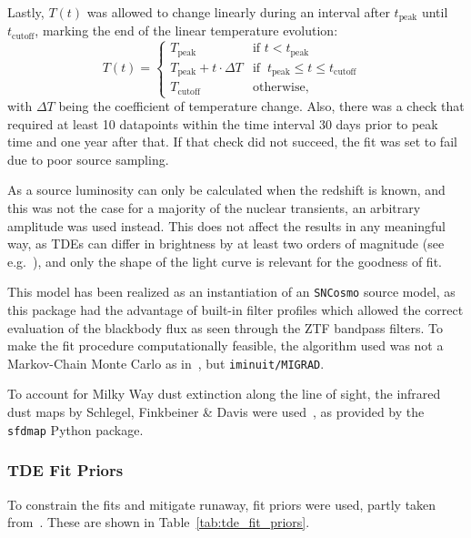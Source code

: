Lastly, $T(t)$ was allowed to change linearly during an interval after $t_\text{peak}$ until $t_\text{cutoff}$, marking the end of the linear temperature evolution:
\begin{equation}
  T(t) = \begin{cases}
    T_\text{peak}                    & \text{if $t<t_\text{peak}$}                              \\
    T_\text{peak} + t \cdot \Delta T & \text{if $~t_\text{peak} \leq t \leq t_\text{cutoff} $ } \\
    T_\text{cutoff}                  & \text{otherwise},
  \end{cases}
\end{equation}
with $\Delta T$ being the coefficient of temperature change. Also, there was a check that required at least 10 datapoints within the time interval 30 days prior to peak time and one year after that. If that check did not succeed, the fit was set to fail due to poor source sampling.

As a source luminosity can only be calculated when the redshift is known, and this was not the case for a majority of the nuclear transients, an arbitrary amplitude was used instead. This does not affect the results in any meaningful way, as TDEs can differ in brightness by at least two orders of magnitude (see e.g.~\cite{Hammerstein2022}), and only the shape of the light curve is relevant for the goodness of fit\cite{Hammerstein2022}.

This model has been realized as an instantiation of an \texttt{SNCosmo} source model, as this package had the advantage of built-in filter profiles which allowed the correct evaluation of the blackbody flux as seen through the ZTF bandpass filters. To make the fit procedure computationally feasible, the algorithm used was not a Markov-Chain Monte Carlo as in~\cite{Velzen2021a}, but \texttt{iminuit/MIGRAD}.

To account for Milky Way dust extinction along the line of sight, the infrared dust maps by Schlegel, Finkbeiner \& Davis were used~, as provided by the \texttt{sfdmap} Python package.

\subsubsection{TDE Fit Priors}
To constrain the fits and mitigate runaway, fit priors were used, partly taken from~\cite{Velzen2021a}. These are shown in Table~\ref{tab:tde_fit_priors}.

